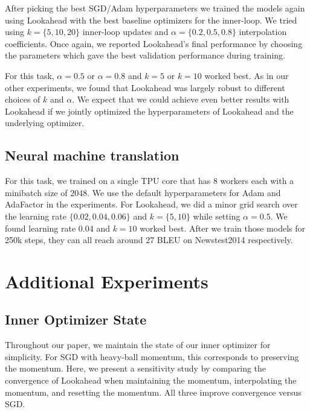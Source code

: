 \documentclass{article}
\begin{document}
After picking the best SGD/Adam hyperparameters we trained the models again using Lookahead with the best baseline optimizers for the inner-loop. We tried using $k=\{5,10,20\}$ inner-loop updates and $\alpha = \{ 0.2, 0.5, 0.8\}$ interpolation coefficients. Once again, we reported Lookahead's final performance by choosing the parameters which gave the best validation performance during training.

For this task, $\alpha=0.5$ or $\alpha=0.8$ and $k=5$ or $k=10$ worked best. As in our other experiments, we found that Lookahead was largely robust to different choices of $k$ and $\alpha$. We expect that we could achieve even better results with Lookahead if we jointly optimized the hyperparameters of Lookahead and the underlying optimizer.

\subsection{Neural machine translation}
\label{app:nmt}

For this task, we trained on a single TPU core that has 8 workers each with a minibatch size of 2048. We use the default hyperparameters for Adam \citep{vaswani2017attention} and AdaFactor \citep{adafactor} in the experiments. For Lookahead, we did a minor grid search over the learning rate $\{0.02, 0.04, 0.06\}$ and $k=\{5, 10\}$ while setting $\alpha=0.5$. We found learning rate 0.04 and $k=10$ worked best. After we train those models for 250k steps, they can all reach around 27 BLEU on Newstest2014 respectively.







\section{Additional Experiments}

\subsection{Inner Optimizer State}
\label{app:interpolation}

Throughout our paper, we maintain the state of our inner optimizer for simplicity. For SGD with heavy-ball momentum, this corresponds to preserving the momentum. Here, we present a sensitivity study by comparing the convergence of Lookahead when maintaining the momentum, interpolating the momentum, and resetting the momentum. All three improve convergence versus SGD.
\end{document}
